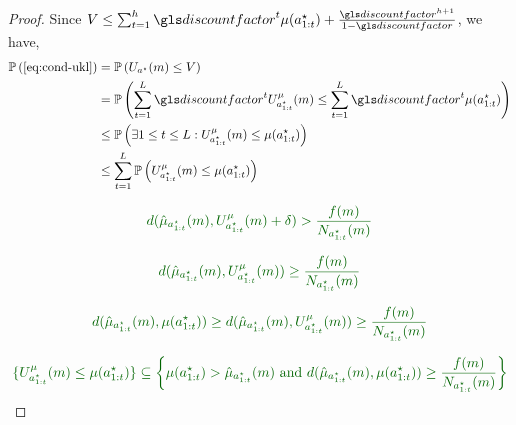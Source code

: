 \begin{proof}
	Since $V \leq \sum_{t=1}^h \discount^t \mu(a^{\star}_{1:t}) + \frac{\discount^{h+1}}{1-\discount}$, we have,
	\begin{align*}
	\probability{\eqref{eq:cond-ukl}} &=  \probability{U_{a^{\star}}(m) \leq V}\\
	&= \probability{\sum_{t=1}^L \discount^t U^{\mu}_{a^{\star}_{1:t}}(m) \leq \sum_{t=1}^L \discount^t \mu(a^{\star}_{1:t})}\\
	&\leq \probability{\exists 1\leq t \leq L : U^{\mu}_{a^{\star}_{1:t}}(m) \leq \mu(a^{\star}_{1:t})} \\
	&\leq \sum_{t=1}^L\probability{U^{\mu}_{a^{\star}_{1:t}}(m) \leq \mu(a^{\star}_{1:t})}
	\end{align*}
	
	
	\begin{equation*}
	\diff{d(\hat{\mu}_{a^{\star}_{1:t}}(m), U^{\mu}_{a^{\star}_{1:t}}(m)+\delta) > \frac{f(m)}{N_{a^{\star}_{1:t}}(m)}}
	\end{equation*}
	
	
	\begin{equation*}
	\diff{d(\hat{\mu}_{a^{\star}_{1:t}}(m), U^{\mu}_{a^{\star}_{1:t}}(m)) \geq \frac{f(m)}{N_{a^{\star}_{1:t}}(m)}}
	\end{equation*}
	
	
	\begin{equation*}
	\diff{d(\hat{\mu}_{a^{\star}_{1:t}}(m), \mu(a^{\star}_{1:t})) \geq d(\hat{\mu}_{a^{\star}_{1:t}}(m), U^{\mu}_{a^{\star}_{1:t}}(m)) \geq \frac{f(m)}{N_{a^{\star}_{1:t}}(m)}}
	\end{equation*}
	
	
	\begin{equation*}
	\diff{\{U^{\mu}_{a^{\star}_{1:t}}(m) \leq \mu(a^{\star}_{1:t})\} \subseteq \left\{ \mu(a^{\star}_{1:t}) > \hat{\mu}_{a^{\star}_{1:t}}(m) \text{ and } d(\hat{\mu}_{a^{\star}_{1:t}}(m), \mu(a^{\star}_{1:t})) \geq \frac{f(m)}{N_{a^{\star}_{1:t}}(m)} \right\}}
	\end{equation*}
	

\end{proof}
